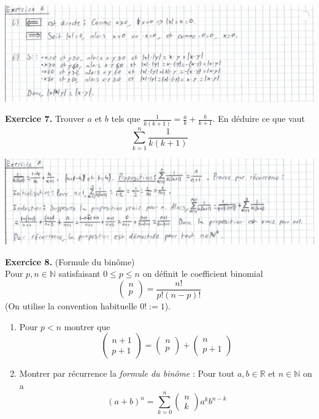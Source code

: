 \documentclass[a4paper, 10pt]{report}
\begin{document}
	\includegraphics{ex06.jpg}
	
	\vspace{5mm}
	\noindent
	\textbf{Exercice 7.} Trouver $a$ et $b$ tels que
	$\frac{1}{k(k+1)} = \frac{a}{k} + \frac{b}{k+1}$.
	En déduire ce que vaut
	\[
		\sum_{k=1}^{n} \frac{1}{k(k+1)}
	\]
	
	\includegraphics{ex07.jpg}
	
	\newpage
	
	\noindent
	\textbf{Exercice 8.} (Formule du binôme)\\
	Pour $p, n \in \mathbb{N}$ satisfaisant $0 \leq p \leq n$ on définit
	le coefficient binomial
	\[\begin{pmatrix}n\\p\end{pmatrix} = \frac{n!}{p!(n - p)!}\]
	(On utilise la convention habituelle $0! := 1$).
	\begin{enumerate}[label=(\roman*)]
		\item Pour $p < n$ montrer que
		\[
			\begin{pmatrix}n+1\\p+1\end{pmatrix} =
			\begin{pmatrix}n\\p\end{pmatrix} +
			\begin{pmatrix}n\\p+1\end{pmatrix}
		\]
		\item Montrer par récurrence la \textit{formule du binôme} : Pour
		tout $a, b \in \mathbb{R}$ et $n \in \mathbb{N}$ on a
		\[
			(a + b)^n = 
			\sum_{k=0}^{n} \begin{pmatrix}n\\k\end{pmatrix} a^k b^{n-k}
		\]
	\end{enumerate}
	
\end{document}
